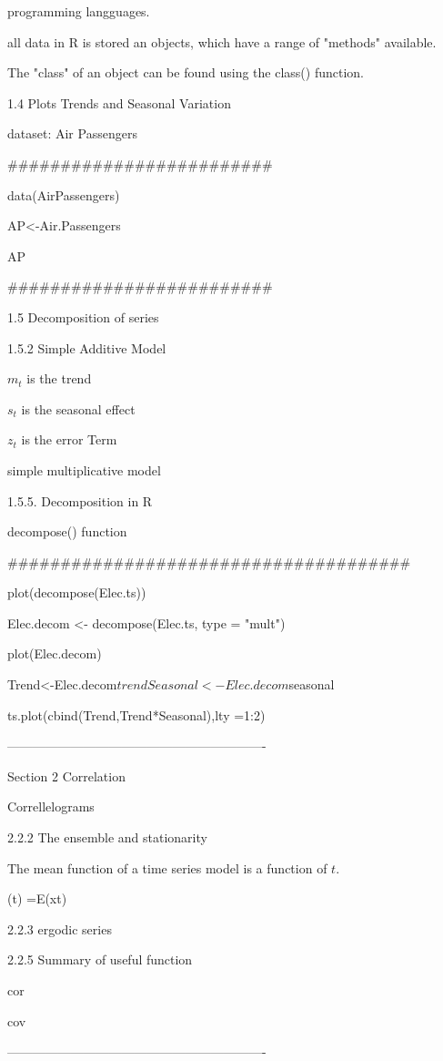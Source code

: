 programming langguages.


all data in R is stored an objects, which have a range of "methods" available.

The "class" of an object can be found using the class() function.

1.4 Plots Trends and Seasonal Variation

dataset: Air Passengers

#########################

data(AirPassengers)

AP<-Air.Passengers

AP

#########################

1.5 Decomposition of series

1.5.2 Simple Additive Model


$m_t$ is the trend

$s_t$ is the seasonal effect

$z_t$ is the error Term

simple multiplicative model




1.5.5. Decomposition in R

decompose() function


######################################

plot(decompose(Elec.ts))

Elec.decom <- decompose(Elec.ts, type = "mult")

plot(Elec.decom)

Trend<-Elec.decom$trend

Seasonal<-Elec.decom$seasonal

ts.plot(cbind(Trend,Trend*Seasonal),lty =1:2)

-------------------------------------------------------------


Section 2 Correlation

Correllelograms


2.2.2 The ensemble and stationarity

The mean function of a time series model is a function of $t$.

(t) =E(xt)


2.2.3 ergodic series


2.2.5 Summary of useful function


cor

cov


-------------------------------------------------------------

